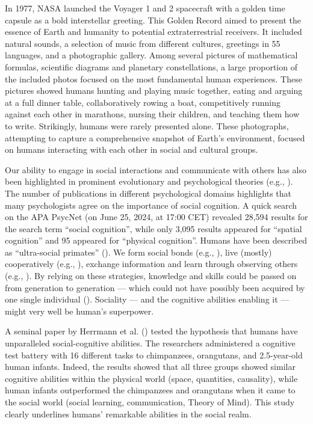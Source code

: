 \documentclass[
]{scrbook}
\begin{document}
In 1977, NASA launched the Voyager 1 and 2 spacecraft with a golden time capsule as a bold interstellar greeting. This Golden Record aimed to present the essence of Earth and humanity to potential extraterrestrial receivers. It included natural sounds, a selection of music from different cultures, greetings in 55 languages, and a photographic gallery. Among several pictures of mathematical formulas, scientific diagrams and planetary constellations, a large proportion of the included photos focused on the most fundamental human experiences. These pictures showed humans hunting and playing music together, eating and arguing at a full dinner table, collaboratively rowing a boat, competitively running against each other in marathons, nursing their children, and teaching them how to write. Strikingly, humans were rarely presented alone. These photographs, attempting to capture a comprehensive snapshot of Earth's environment, focused on humans interacting with each other in social and cultural groups.

Our ability to engage in social interactions and communicate with others has also been highlighted in prominent evolutionary and psychological theories (e.g., ). The number of publications in different psychological domains highlights that many psychologists agree on the importance of social cognition. A quick search on the APA PsycNet (on June 25, 2024, at 17:00 CET) revealed 28,594 results for the search term ``social cognition'', while only 3,095 results appeared for ``spatial cognition'' and 95 appeared for ``physical cognition''. Humans have been described as ``ultra-social primates'' (). We form social bonds (e.g., ), live (mostly) cooperatively (e.g., ), exchange information and learn through observing others (e.g., ). By relying on these strategies, knowledge and skills could be passed on from generation to generation --- which could not have possibly been acquired by one single individual (). Sociality --- and the cognitive abilities enabling it --- might very well be human's superpower.

A seminal paper by Herrmann et al. () tested the hypothesis that humans have unparalleled social-cognitive abilities. The researchers administered a cognitive test battery with 16 different tasks to chimpanzees, orangutans, and 2.5-year-old human infants. Indeed, the results showed that all three groups showed similar cognitive abilities within the physical world (space, quantities, causality), while human infants outperformed the chimpanzees and orangutans when it came to the social world (social learning, communication, Theory of Mind). This study clearly underlines humans' remarkable abilities in the social realm.
\end{document}
